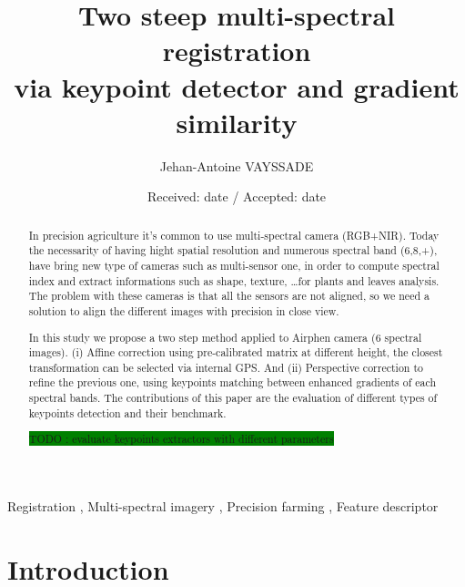 \documentclass[]{elsarticle}
\begin{document}
	
	\onecolumn
	
	\begin{abstract}
		In precision agriculture it's common to use multi-spectral camera (RGB+NIR).
		Today the necessarity of having hight spatial resolution and numerous spectral band (6,8,+), have bring new type of cameras such as multi-sensor one,
		in order to compute spectral index and extract informations such as shape, texture, \dots for plants and leaves analysis.
		The problem with these cameras is that all the sensors are not aligned, so we need a solution to align the different images with precision in close view.
		
		In this study we propose a two step method applied to Airphen camera (6 spectral images).
		(i) Affine correction using pre-calibrated matrix at different height, the closest transformation can be selected via internal GPS.
		And (ii) Perspective correction to refine the previous one, using keypoints matching between enhanced gradients of each spectral bands.
		The contributions of this paper are the evaluation of different types of keypoints detection and their benchmark.
		
		\colorbox{green}{TODO : evaluate keypoints extractors with different parameters}
	\end{abstract}
	
	\begin{keyword}
		Registration \sep
		Multi-spectral imagery \sep
		Precision farming \sep
		Feature descriptor
	\end{keyword}
	
	\begin{frontmatter}
		\title{Two steep multi-spectral registration \\ via keypoint detector and gradient similarity}
		\author[unilu]{Jehan-Antoine VAYSSADE} 
		\address[myuni]{Agrosup D2A2E pole GestAd equipe agriculture de precision 21000 Dijon, France}
		\date{Received: date / Accepted: date}
	\end{frontmatter}
	
	\newpage
	\twocolumn
	
	\section{Introduction}
	
\end{document}
